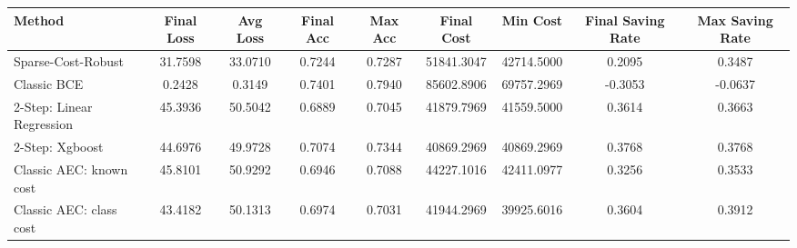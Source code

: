 \begin{tabular}{lcccccccc}
\toprule
Method & Final Loss & Avg Loss & Final Acc & Max Acc & Final Cost & Min Cost & Final Saving Rate & Max Saving Rate \\
\midrule
Sparse-Cost-Robust & 31.7598 & 33.0710 & 0.7244 & 0.7287 & 51841.3047 & 42714.5000 & 0.2095 & 0.3487 \\
Classic BCE & 0.2428 & 0.3149 & 0.7401 & 0.7940 & 85602.8906 & 69757.2969 & -0.3053 & -0.0637 \\
2-Step: Linear Regression & 45.3936 & 50.5042 & 0.6889 & 0.7045 & 41879.7969 & 41559.5000 & 0.3614 & 0.3663 \\
2-Step: Xgboost & 44.6976 & 49.9728 & 0.7074 & 0.7344 & 40869.2969 & 40869.2969 & 0.3768 & 0.3768 \\
Classic AEC: known cost & 45.8101 & 50.9292 & 0.6946 & 0.7088 & 44227.1016 & 42411.0977 & 0.3256 & 0.3533 \\
Classic AEC: class cost & 43.4182 & 50.1313 & 0.6974 & 0.7031 & 41944.2969 & 39925.6016 & 0.3604 & 0.3912 \\
\bottomrule
\end{tabular}
